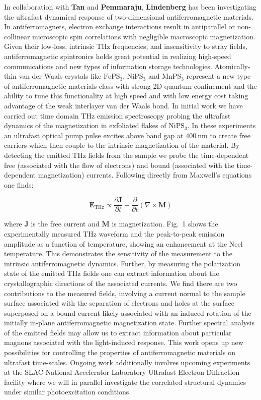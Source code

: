 In collaboration with {\bf Tan} and {\bf Pemmaraju}, {\bf Lindenberg} has been investigating the ultrafast dynamical response of two-dimensional antiferromagnetic materials.
In antiferromagnets, electron exchange interactions result in antiparallel or non-collinear microscopic spin correlations with negligible macroscopic magnetization.
Given their low-loss, intrinsic THz frequencies, and insensitivity to stray fields, antiferromagnetic spintronics holds great potential in realizing high-speed communications and new types of information storage technologies. 
Atomically-thin van der Waals crystals like \(\mathrm{FePS_3}\), \(\mathrm{NiPS_3}\) and \(\mathrm{MnPS_3}\) represent a new type of antiferromagnetic materials class with strong 2D quantum confinement and the ability to tune this functionality at high speed and with low energy cost taking advantage of the weak interlayer van der Waals bond.
In initial work we have carried out time domain THz emission spectroscopy probing the ultrafast dynamics of the magnetization in exfoliated flakes of \(\mathrm{NiPS_3}\).
In these experiments an ultrafast optical pump pulse excites above band gap at \(400~\mathrm{nm}\) to create free carriers which then couple to the intrinsic magnetization of the material.
By detecting the emitted THz fields from the sample we probe the time-dependent free (associated with the flow of electrons) and bound (associated with the time-dependent magnetization) currents.  Following directly from Maxwell’s equations one finds: 

\begin{equation}
\mathbf{E}_\text{THz} \propto \frac{\partial\mathbf{J}}{\partial t}+ \frac{\partial}{\partial t} (\nabla \times \mathbf{M})
\end{equation}

where \(\mathbf{J}\) is the free current and \(\mathbf{M}\) is magnetization. 
Fig.~1 shows the experimentally measured THz waveform and the peak-to-peak emission amplitude as a function of temperature, showing an enhancement at the Neel temperature.
This demonstrates the sensitivity of the measurement to the intrinsic antiferromagnetic dynamics.
Further, by measuring the polarization state of the emitted THz fields one can extract information about the crystallographic directions of the associated currents.
We find there are two contributions to the measured fields, involving a current normal to the sample surface associated with the separation of electrons and holes at the surface superposed on a bound current likely associated with an induced rotation of the initially in-plane antiferromagnetic magnetization state.
Further spectral analysis of the emitted fields may allow us to extract information about particular magnons associated with the light-induced response.
This work opens up new possibilities for controlling the properties of antiferromagnetic materials on ultrafast time-scales. 
Ongoing work additionally involves upcoming experiments at the SLAC National Accelerator Laboratory Ultrafast Electron Diffraction facility where we will in parallel investigate the correlated structural dynamics under similar photoexcitation conditions.

